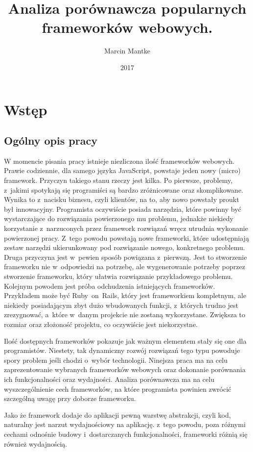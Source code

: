 \documentclass[mgr,oneside]{mgr}
\author{Marcin Mantke}
\title{Analiza porównawcza popularnych frameworków webowych.}
\date{2017}
\begin{document}
\maketitle
\tableofcontents
\chapter{Wstęp}
\section{Ogólny opis pracy}
W momencie pisania pracy istnieje niezliczona ilość frameworków webowych. Prawie codziennie, dla samego języka JavaScript, powstaje jeden nowy (micro) framework. Przyczyn takiego stanu rzeczy jest kilka. Po pierwsze, problemy, z~jakimi spotykają się programiści są bardzo zróżnicowane oraz skomplikowane. Wynika to z~nacisku biznesu, czyli klientów, na to, aby nowo powstały proukt był innowacyjny. Programista oczywiście posiada narzędzia, które powinny być wystarczające do rozwiązania powierzonego mu problemu, jednakże niekiedy korzystanie z~narzuconych przez framework rozwiązań wręcz utrudnia wykonanie powierzonej pracy. Z~tego powodu powstają nowe frameworki, które udostępniają zestaw narzędzi ukierunkowany pod rozwiązanie nowego, konkretnego problemu. Druga przyczyna jest w~pewien sposób powiązana z~pierwszą. Jest to stworzenie frameworku nie w~odpowiedzi na potrzebę, ale wygenerowanie potrzeby poprzez stworzenie frameworku, który ułatwia rozwiązanie przykładowego problemu. Kolejnym powodem jest próba odchudzenia istniejących frameworków. Przykładem może być Ruby~on~Rails, który jest frameworkiem kompletnym, ale niekiedy posiadającym zbyt dużo wbudowanych funkcji, z~których trudno jest zrezygnować, a~które w~danym projekcie nie zostaną wykorzystane. Zwiększa to rozmiar oraz złożoność projektu, co oczywiście jest niekorzystne.

Ilość dostępnych frameworków pokazuje jak ważnym elementem stały się one dla programistów. Niestety, tak dynamiczny rozwój rozwiązań tego typu powoduje spory problem jeśli chodzi o~wybór technologii. Ninejsza praca ma na celu zaprezentowanie wybranych frameworków webowych oraz dokonanie porównania ich funkcjonalności oraz wydajności. Analiza porównawcza ma na celu wyszczególnienie cech frameworków, na które programista powinien zwrócić szczególną uwagę przy doborze frameworku.

Jako że framework dodaje do aplikacji pewną warstwę abstrakcji, czyli kod, naturalny jest narzut wydajnościowy na aplikację. z~tego powodu, poza różnymi cechami odnośnie budowy i~dostarczanych funkcjonalności, frameworki różnią się również wydajnością.
\end{document}
